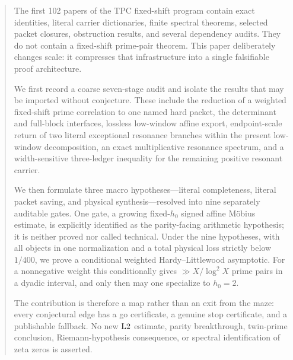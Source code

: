 \begin{abstract}
The first 102 papers of the TPC fixed-shift program contain exact
identities, literal carrier dictionaries, finite spectral theorems,
selected packet closures, obstruction results, and several
dependency audits.  They do not contain a fixed-shift prime-pair
theorem.  This paper deliberately changes scale: it compresses that
infrastructure into a single falsifiable proof architecture.

We first record a coarse seven-stage audit and isolate the results
that may be imported without conjecture.  These include the reduction
of a weighted fixed-shift prime correlation to one named hard packet,
the determinant and full-block interfaces, lossless low-window affine
export, endpoint-scale return of two literal exceptional resonance
branches within the present low-window decomposition, an exact
multiplicative resonance spectrum, and a
width-sensitive three-ledger inequality for the remaining positive
resonant carrier.

We then formulate three macro hypotheses---literal completeness,
literal packet saving, and physical synthesis---resolved into nine
separately auditable gates.  One gate, a growing fixed-\(h_0\)
signed affine M\"obius estimate, is explicitly identified as the
parity-facing arithmetic hypothesis; it is neither proved nor called
technical.  Under the nine hypotheses, with all objects in one
normalization and a total physical loss strictly below \(1/400\), we
prove a conditional weighted Hardy--Littlewood asymptotic.  For a
nonnegative weight this conditionally gives \(\gg X/\log^2 X\)
prime pairs in a dyadic interval, and only then may one specialize to
\(h_0=2\).

The contribution is therefore a map rather than an exit from the
maze: every conjectural edge has a go certificate, a genuine stop
certificate, and a publishable fallback.  No new \(\Ltwo\) estimate,
parity breakthrough, twin-prime conclusion, Riemann-hypothesis
consequence, or spectral identification of zeta zeros is asserted.
\end{abstract}

